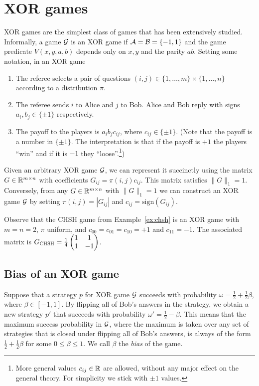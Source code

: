 \section{XOR games}

XOR games are the simplest class of games that has been extensively studied. Informally, a game $\mathcal{G}$ is an XOR game if $\mathcal{A}=\mathcal{B}=\{-1,1\}$ and the game predicate $V(x,y,a,b)$ depends only on $x,y$ and the parity $a b$. Setting some notation, in an XOR game
\begin{enumerate}
  \item The referee selects a pair of questions $(i,j)\in \{1,\ldots, m\}\times \{1,\ldots, n\}$
   according to a distribution $\pi$. 
  \item The referee sends $i$ to Alice and $j$ to Bob. Alice and Bob reply with signs $a_i,b_j\in\{\pm 1\}$ respectively.
  \item The payoff to the players is $a_ib_jc_{ij}$, where $c_{ij}\in\{\pm 1\}$. (Note that the payoff is a number in $\{\pm 1\}$. The interpretation is that if the payoff is $+1$ the players ``win'' and if it is $-1$ they ``loose''.\footnote{More general values $c_{ij}\in\mathbb{R}$ are allowed, without any major effect on the general theory. For simplicity we stick with $\pm1$ values.})
\end{enumerate}
Given an arbitrary XOR game $\cal G$, we can represent it succinctly using the matrix $G\in\mathbb{R}^{m\times n}$ with coefficients $G_{ij}=\pi(i,j)c_{ij}$. This matrix satisfies $\|G\|_1=1$. Conversely, from any $G\in \mathbb{R}^{m\times n}$ with $\|G\|_1=1$ we can construct an XOR game $\cal G$ by setting $\pi(i,j)=|G_{ij}|$ and $c_{ij}=\text{sign}(G_{ij})$. 

Observe that the CHSH game from Example~\ref{ex:chsh} is an XOR game with $m=n=2$, $\pi$ uniform, and $c_{00}=c_{01}=c_{10}=+1$ and $c_{11}=-1$. The associated matrix is $G_{\textsc{CHSH}}=\frac{1}{4}\begin{pmatrix} 1 & 1 \\ 1 & -1\end{pmatrix}$. 

\subsection{Bias of an XOR game}

Suppose that a strategy $p$ for XOR game $\mathcal{G}$ succeeds with probability $\omega = \frac{1}{2}+\frac{1}{2}\beta$, where $\beta\in[-1,1]$. By flipping all of Bob's answers in the strategy, we obtain a new strategy $p'$ that succeeds with probability $\omega'=\frac{1}{2}-\beta$. This means that the maximum success probability in $\mathcal{G}$, where the maximum is taken over any set of strategies that is closed under flipping all of Bob's answers, is always of the form $\frac{1}{2}+\frac{1}{2}\beta$ for some $0\leq \beta\leq 1$. We call $\beta$ the \emph{bias} of the game. 

